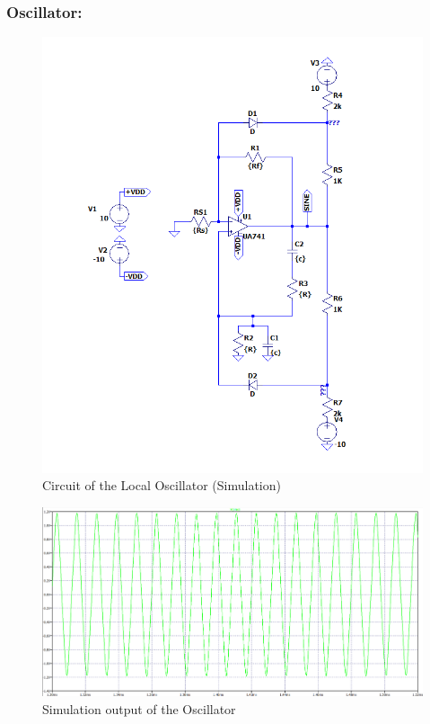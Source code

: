 \documentclass[conference]{IEEEtran}
\begin{document}
\subsubsection{Oscillator:}
\begin{figure}
    \centering
    \includegraphics[width=1\linewidth]{Images/Wein_bridge_oscillator_ltspice.png}
    \caption{Circuit of the Local Oscillator (Simulation)}
\end{figure}

\begin{figure}
    \centering
    \includegraphics[width=1\linewidth]{Images/Osc_simulation.png}
    \caption{Simulation output of the Oscillator}
\end{figure}
\end{document}
